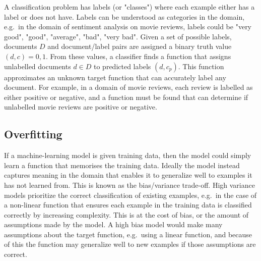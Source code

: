  A classification problem has  labels (or "classes") where each example either has  a label or does not have. Labels can be understood as categories in the domain, e.g.\ in the domain of sentiment analysis on movie reviews, labels could be "very good", "good", "average", "bad", "very bad". Given a set of possible labels, documents $D$ and document/label pairs are assigned a binary truth value $(d, c) = {0, 1}$. From these values, a classifier finds a function that assigns unlabelled documents $d \in D$ to predicted labels $(d, c_p) $. This function approximates an unknown target function that can accurately label any document. For example, in a domain of movie reviews, each review is labelled as either positive or negative, and a function must be found that can determine if unlabelled movie reviews are positive or negative. 



\subsection{Overfitting} %


If a machine-learning model is given training data, then the model could simply learn a function that memorises the training data. Ideally the model instead captures meaning in the domain that enables it to generalize well to examples it has not learned from.  This is known as the bias/variance trade-off. High variance models prioritize the correct classification of existing examples, e.g.\ in the case of a non-linear function that ensures each example in the training data is classified correctly by increasing complexity. This is at the cost of bias, or the amount of assumptions made by the model. A high bias model would make many assumptions about the target function, e.g.\ using a linear function, and because of this the function may generalize well to new examples if those assumptions are correct.

